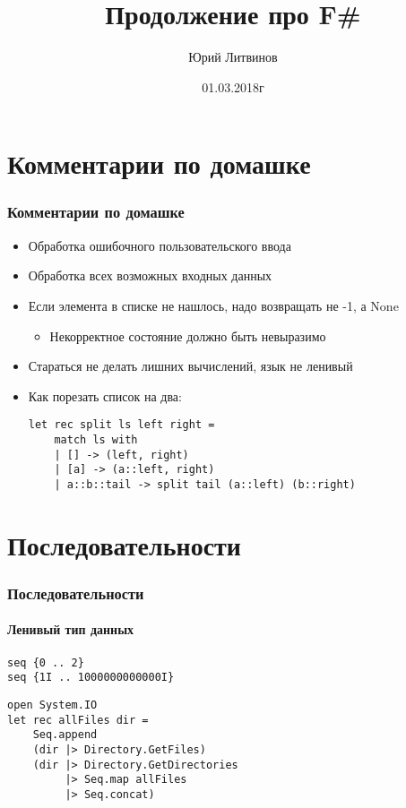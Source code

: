 \documentclass[xetex,mathserif,serif]{beamer}
\title{Продолжение про F\#}
\author{Юрий Литвинов}
\date{01.03.2018г}
\begin{document}
	
	\frame{\titlepage}

	\section{Комментарии по домашке}

	\begin{frame}[fragile]
		\frametitle{Комментарии по домашке}
		\begin{itemize}
			\item Обработка ошибочного пользовательского ввода
			\item Обработка всех возможных входных данных
			\item Если элемента в списке не нашлось, надо возвращать не -1, а None
			\begin{itemize}
				\item Некорректное состояние должно быть невыразимо
			\end{itemize}
			\item Стараться не делать лишних вычислений, язык не ленивый
			\item Как порезать список на два:
				\begin{verbatim}
let rec split ls left right =
    match ls with
    | [] -> (left, right)
    | [a] -> (a::left, right)
    | a::b::tail -> split tail (a::left) (b::right)
				\end{verbatim}
		\end{itemize}
	\end{frame}

	\section{Последовательности}
	
	\begin{frame}[fragile]
		\frametitle{Последовательности}
		\framesubtitle{Ленивый тип данных}
		\begin{verbatim}
seq {0 .. 2}
seq {1I .. 1000000000000I}
		\end{verbatim}

		\begin{verbatim}
open System.IO
let rec allFiles dir =
    Seq.append
    (dir |> Directory.GetFiles)
    (dir |> Directory.GetDirectories 
         |> Seq.map allFiles 
         |> Seq.concat)
		\end{verbatim}
	\end{frame}
\end{document}
